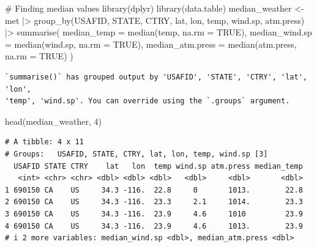 \documentclass[
  letterpaper,
  DIV=11,
  numbers=noendperiod]{scrartcl}
\newenvironment{Shaded}{\begin{snugshade}}{\end{snugshade}}
\newcommand{\AttributeTok}[1]{\textcolor[rgb]{0.40,0.45,0.13}{#1}}
\newcommand{\CommentTok}[1]{\textcolor[rgb]{0.37,0.37,0.37}{#1}}
\newcommand{\ConstantTok}[1]{\textcolor[rgb]{0.56,0.35,0.01}{#1}}
\newcommand{\DecValTok}[1]{\textcolor[rgb]{0.68,0.00,0.00}{#1}}
\newcommand{\FunctionTok}[1]{\textcolor[rgb]{0.28,0.35,0.67}{#1}}
\newcommand{\NormalTok}[1]{\textcolor[rgb]{0.00,0.23,0.31}{#1}}
\newcommand{\OtherTok}[1]{\textcolor[rgb]{0.00,0.23,0.31}{#1}}
\newcommand{\SpecialCharTok}[1]{\textcolor[rgb]{0.37,0.37,0.37}{#1}}
\begin{document}
\begin{Shaded}
\begin{Highlighting}[]
\CommentTok{\# Finding median values}
\FunctionTok{library}\NormalTok{(dplyr)}
\FunctionTok{library}\NormalTok{(data.table)}
\NormalTok{median\_weather }\OtherTok{\textless{}{-}}\NormalTok{ met }\SpecialCharTok{|\textgreater{}}
\FunctionTok{group\_by}\NormalTok{(USAFID, STATE, CTRY, lat, lon, temp, wind.sp, atm.press) }\SpecialCharTok{|\textgreater{}}
  \FunctionTok{summarise}\NormalTok{(}
    \AttributeTok{median\_temp =} \FunctionTok{median}\NormalTok{(temp, }\AttributeTok{na.rm =} \ConstantTok{TRUE}\NormalTok{),}
    \AttributeTok{median\_wind.sp =} \FunctionTok{median}\NormalTok{(wind.sp, }\AttributeTok{na.rm =} \ConstantTok{TRUE}\NormalTok{),}
    \AttributeTok{median\_atm.press =} \FunctionTok{median}\NormalTok{(atm.press, }\AttributeTok{na.rm =} \ConstantTok{TRUE}\NormalTok{)}
\NormalTok{  )}
\end{Highlighting}
\end{Shaded}

\begin{verbatim}
`summarise()` has grouped output by 'USAFID', 'STATE', 'CTRY', 'lat', 'lon',
'temp', 'wind.sp'. You can override using the `.groups` argument.
\end{verbatim}

\begin{Shaded}
\begin{Highlighting}[]
\FunctionTok{head}\NormalTok{(median\_weather, }\DecValTok{4}\NormalTok{)}
\end{Highlighting}
\end{Shaded}

\begin{verbatim}
# A tibble: 4 x 11
# Groups:   USAFID, STATE, CTRY, lat, lon, temp, wind.sp [3]
  USAFID STATE CTRY    lat   lon  temp wind.sp atm.press median_temp
   <int> <chr> <chr> <dbl> <dbl> <dbl>   <dbl>     <dbl>       <dbl>
1 690150 CA    US     34.3 -116.  22.8     0       1013.        22.8
2 690150 CA    US     34.3 -116.  23.3     2.1     1014.        23.3
3 690150 CA    US     34.3 -116.  23.9     4.6     1010         23.9
4 690150 CA    US     34.3 -116.  23.9     4.6     1013.        23.9
# i 2 more variables: median_wind.sp <dbl>, median_atm.press <dbl>
\end{verbatim}
\end{document}
